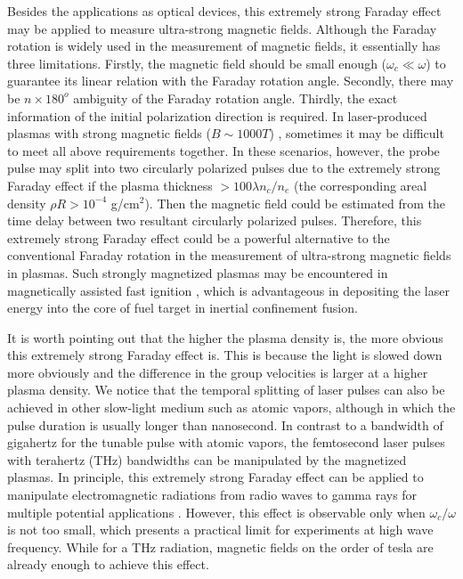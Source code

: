 \documentclass[%
aps,
preprint,
showpacs,
preprintnumbers,
 amsmath,
 amssymb,
 prl,
]{revtex4-1}
\begin{document}
Besides the applications as optical devices, this extremely strong Faraday effect may be applied to measure ultra-strong magnetic fields. Although the Faraday rotation is widely used in the measurement of magnetic fields, it essentially has three limitations.
Firstly, the magnetic field should be small enough ($\omega_c\ll\omega$) to guarantee its linear relation with the Faraday rotation angle.
Secondly, there may be $n\times180^o$ ambiguity of the Faraday rotation angle.
Thirdly, the exact information of the initial polarization direction is required.
In laser-produced plasmas with strong magnetic fields ($B \sim 1000T$) \cite{Wagner,Fujioka}, sometimes it may be difficult to meet all above requirements together.
In these scenarios, however, the probe pulse may split into two circularly polarized pulses due to the extremely strong Faraday effect if the plasma thickness $>100\lambda n_c/n_e$ (the corresponding areal density $\rho R > 10^{-4}$ g/cm$^2$).
Then the magnetic field could be estimated from the time delay between two resultant circularly polarized pulses.
Therefore, this extremely strong Faraday effect could be a powerful alternative to the conventional Faraday rotation in the measurement of ultra-strong magnetic fields in plasmas.
Such strongly magnetized plasmas may be encountered in magnetically assisted fast ignition \cite{WangMAFI}, which is advantageous in depositing the laser energy into the core of fuel target in inertial confinement fusion.

It is worth pointing out that the higher the plasma density is, the more obvious this extremely strong Faraday effect is. This is because the light is slowed down more obviously and the difference in the group velocities is larger at a higher plasma density.
We notice that the temporal splitting of laser pulses can also be achieved in other slow-light medium such as atomic vapors\cite{Grischkowsky}, although in which the pulse duration is usually longer than nanosecond.
In contrast to a bandwidth of gigahertz for the tunable pulse with atomic vapors\cite{Camacho}, the femtosecond laser pulses with terahertz (THz) bandwidths can be manipulated by the magnetized plasmas.
In principle, this extremely strong Faraday effect can be applied to manipulate electromagnetic radiations from radio waves to gamma rays for multiple potential applications \cite{Gibbon,Teubner,Wang}.
However, this effect is observable only when $\omega_c/\omega$ is not too small, which presents a practical limit for experiments at high wave frequency.
While for a THz radiation, magnetic fields on the order of tesla are already enough to achieve this effect.
\end{document}
